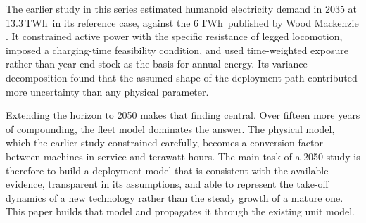 \documentclass[11pt]{article}
\newcommand{\TWh}{\,TWh}
\begin{document}
The earlier study in this series estimated humanoid electricity demand in 2035 at 13.3\TWh\ in its reference case, against the 6\TWh\ published by Wood Mackenzie \citep{merilehto2026a,woodmac2026}. It constrained active power with the specific resistance of legged locomotion, imposed a charging-time feasibility condition, and used time-weighted exposure rather than year-end stock as the basis for annual energy. Its variance decomposition found that the assumed shape of the deployment path contributed more uncertainty than any physical parameter.

Extending the horizon to 2050 makes that finding central. Over fifteen more years of compounding, the fleet model dominates the answer. The physical model, which the earlier study constrained carefully, becomes a conversion factor between machines in service and terawatt-hours. The main task of a 2050 study is therefore to build a deployment model that is consistent with the available evidence, transparent in its assumptions, and able to represent the take-off dynamics of a new technology rather than the steady growth of a mature one. This paper builds that model and propagates it through the existing unit model.
\end{document}
